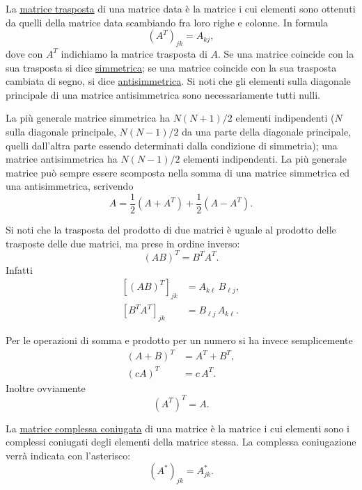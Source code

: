 \documentclass[11pt, a4paper]{book}
\numberwithin{equation}{section}
\begin{document}
La \uline{matrice trasposta} di una matrice data è la matrice i cui elementi sono ottenuti da quelli della matrice data scambiando fra loro righe e colonne. In formula
\begin{equation}
    \left(A^T\right)_{jk} = A_{kj},
    \tag{22}
\end{equation}
dove con $A^T$ indichiamo la matrice trasposta di $A$. Se una matrice coincide con la sua trasposta si dice \uline{simmetrica}; se una matrice coincide con la sua trasposta cambiata di segno, si dice \uline{antisimmetrica}. Si noti che gli elementi sulla diagonale principale di una matrice antisimmetrica sono necessariamente tutti nulli.

La più generale matrice simmetrica ha $N(N+1)/2$ elementi indipendenti ($N$ sulla diagonale principale, $N(N-1)/2$ da una parte della diagonale principale, quelli dall'altra parte essendo determinati dalla condizione di simmetria); una matrice antisimmetrica ha $N(N-1)/2$ elementi indipendenti. La più generale matrice può sempre essere scomposta nella somma di una matrice simmetrica ed una antisimmetrica, scrivendo
\[
    A = \frac{1}{2}\left(A + A^T\right) + \frac{1}{2}\left(A - A^T\right).
\]

Si noti che la trasposta del prodotto di due matrici è uguale al prodotto delle trasposte delle due matrici, ma prese in ordine inverso:
\begin{equation}
    (AB)^T = B^T A^T.
    \tag{23}
\end{equation}
Infatti
\begin{align}
    \left[(AB)^T\right]_{jk} &= A_{k\ell}\, B_{\ell j},
    \tag{24a} \\
    \left[B^T A^T\right]_{jk} &= B_{\ell j}\, A_{k\ell}.
    \tag{24b}
\end{align}

Per le operazioni di somma e prodotto per un numero si ha invece semplicemente
\begin{align}
    (A + B)^T &= A^T + B^T,
    \tag{25} \\
    (cA)^T &= c\, A^T.
    \tag{26}
\end{align}
Inoltre ovviamente
\begin{equation}
    \left(A^T\right)^T = A.
    \tag{27}
\end{equation}

La \uline{matrice complessa coniugata} di una matrice è la matrice i cui elementi sono i complessi coniugati degli elementi della matrice stessa. La complessa coniugazione verrà indicata con l'asterisco:
\[
    \left(A^*\right)_{jk} = A_{jk}^*.
\]
\end{document}
